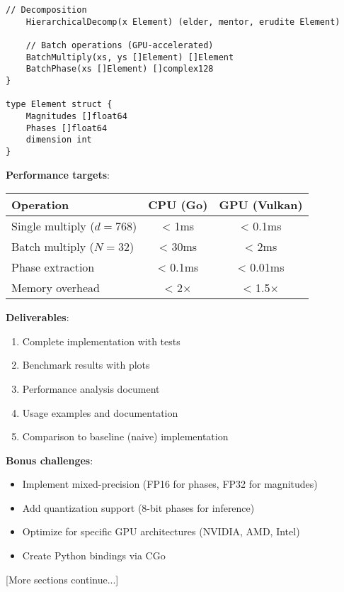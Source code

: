 \begin{coding}
\begin{lstlisting}[style=golang]
    // Decomposition
    HierarchicalDecomp(x Element) (elder, mentor, erudite Element)
    
    // Batch operations (GPU-accelerated)
    BatchMultiply(xs, ys []Element) []Element
    BatchPhase(xs []Element) []complex128
}

type Element struct {
    Magnitudes []float64
    Phases []float64
    dimension int
}
\end{lstlisting}

\textbf{Performance targets}:
\begin{center}
\begin{tabular}{|l|c|c|}
\hline
Operation & CPU (Go) & GPU (Vulkan) \\
\hline
Single multiply ($d=768$) & < 1ms & < 0.1ms \\
Batch multiply ($N=32$) & < 30ms & < 2ms \\
Phase extraction & < 0.1ms & < 0.01ms \\
Memory overhead & < 2× & < 1.5× \\
\hline
\end{tabular}
\end{center}

\textbf{Deliverables}:
\begin{enumerate}
\item Complete implementation with tests
\item Benchmark results with plots
\item Performance analysis document
\item Usage examples and documentation
\item Comparison to baseline (naive) implementation
\end{enumerate}

\textbf{Bonus challenges}:
\begin{itemize}
\item Implement mixed-precision (FP16 for phases, FP32 for magnitudes)
\item Add quantization support (8-bit phases for inference)
\item Optimize for specific GPU architectures (NVIDIA, AMD, Intel)
\item Create Python bindings via CGo
\end{itemize}
\end{coding}

[More sections continue...]

